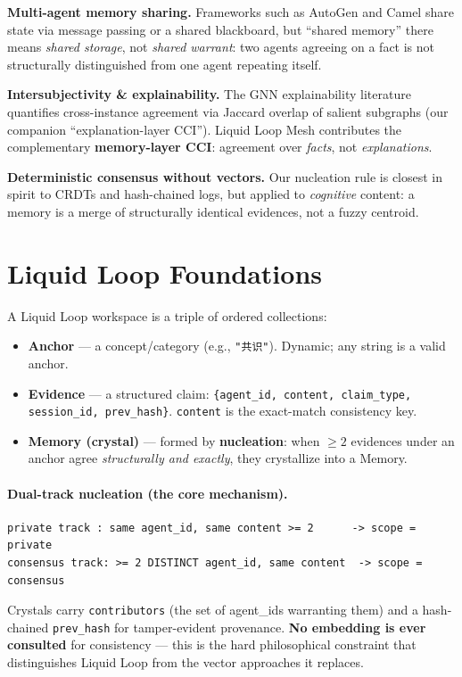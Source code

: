 \documentclass[UTF8]{ctexart}
\begin{document}
\textbf{Multi-agent memory sharing.} Frameworks such as AutoGen and Camel share
state via message passing or a shared blackboard, but ``shared memory'' there
means \emph{shared storage}, not \emph{shared warrant}: two agents agreeing on a fact is
not structurally distinguished from one agent repeating itself.

\textbf{Intersubjectivity \& explainability.} The GNN explainability literature
quantifies cross-instance agreement via Jaccard overlap of salient subgraphs
(our companion ``explanation-layer CCI''). Liquid Loop Mesh contributes the
complementary \textbf{memory-layer CCI}: agreement over \emph{facts}, not \emph{explanations}.

\textbf{Deterministic consensus without vectors.} Our nucleation rule is closest in
spirit to CRDTs and hash-chained logs, but applied to \emph{cognitive} content: a
memory is a merge of structurally identical evidences, not a fuzzy centroid.

\section{Liquid Loop Foundations}
A Liquid Loop workspace is a triple of ordered collections:

\begin{itemize}
  \item \textbf{Anchor} --- a concept/category (e.g., \texttt{"共识"}). Dynamic; any string is a
  valid anchor.
  \item \textbf{Evidence} --- a structured claim: \texttt{\{agent\_id, content, claim\_type,
  session\_id, prev\_hash\}}. \texttt{content} is the exact-match consistency key.
  \item \textbf{Memory (crystal)} --- formed by \textbf{nucleation}: when $\ge 2$ evidences under an
  anchor agree \emph{structurally and exactly}, they crystallize into a Memory.
\end{itemize}

\paragraph{Dual-track nucleation (the core mechanism).}
\begin{verbatim}
private track : same agent_id, same content >= 2      -> scope = private
consensus track: >= 2 DISTINCT agent_id, same content  -> scope = consensus
\end{verbatim}

Crystals carry \texttt{contributors} (the set of agent\_ids warranting them) and a
hash-chained \texttt{prev\_hash} for tamper-evident provenance. \textbf{No embedding is ever
consulted} for consistency --- this is the hard philosophical constraint that
distinguishes Liquid Loop from the vector approaches it replaces.
\end{document}
